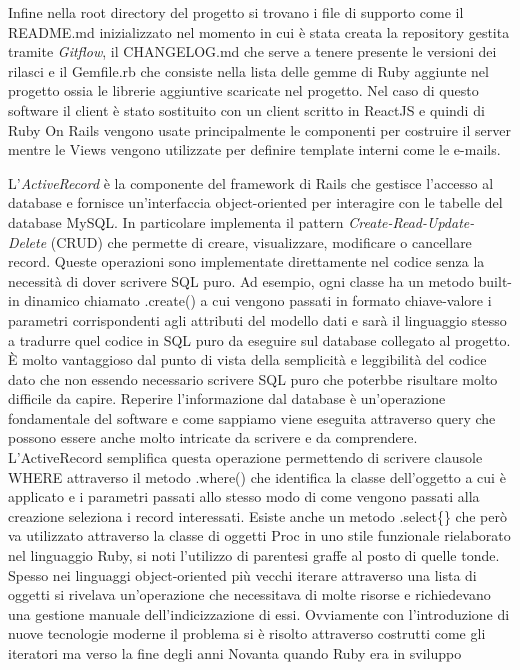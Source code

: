 \documentclass[target=bach,aauheader=,style=]{thud}
\begin{document}
Infine nella root directory del progetto si trovano i file di supporto come il README.md inizializzato nel momento in cui è stata creata la repository gestita tramite
\textit{Gitflow}\cite{gitflow}, il CHANGELOG.md che serve a tenere presente le versioni dei rilasci 
e il Gemfile.rb che consiste nella lista delle gemme di Ruby aggiunte nel progetto ossia le librerie aggiuntive scaricate nel progetto.
Nel caso di questo software il client è stato sostituito con un client scritto in ReactJS e quindi di Ruby On Rails vengono usate principalmente le componenti
per costruire il server mentre le Views vengono utilizzate per definire template interni come le e-mails.
\par L'\textit{ActiveRecord} è la componente del framework di Rails che gestisce l'accesso al database e fornisce un'interfaccia object-oriented per interagire con le tabelle
del database MySQL. In particolare implementa il pattern \textit{Create-Read-Update-Delete} (CRUD)\cite{ibm_crud} che permette di creare, visualizzare, modificare
o cancellare record. Queste operazioni sono implementate direttamente nel codice senza la necessità di dover scrivere SQL puro. Ad esempio, ogni classe ha un metodo built-in dinamico
chiamato .create() a cui vengono passati in formato chiave-valore i parametri corrispondenti agli attributi del modello dati e sarà il linguaggio stesso a tradurre
quel codice in SQL puro da eseguire sul database collegato al progetto. È molto vantaggioso dal punto di vista della semplicità e leggibilità del codice dato che
non essendo necessario scrivere SQL puro che poterbbe risultare molto difficile da capire.
Reperire l'informazione dal database è un'operazione fondamentale del software e come sappiamo viene eseguita attraverso query che possono essere anche molto intricate
da scrivere e da comprendere. L'ActiveRecord semplifica questa operazione permettendo di scrivere clausole WHERE attraverso il metodo .where() che identifica la classe dell'oggetto
a cui è applicato e i parametri passati allo stesso modo di come vengono passati alla creazione seleziona i record interessati. Esiste anche un metodo .select\{\} che però va utilizzato
attraverso la classe di oggetti Proc in uno stile funzionale rielaborato nel linguaggio Ruby, si noti l'utilizzo di parentesi graffe al posto di quelle tonde. Spesso nei linguaggi
object-oriented più vecchi iterare attraverso una lista di oggetti si rivelava un'operazione che necessitava di molte risorse e richiedevano una gestione manuale dell'indicizzazione di essi.
Ovviamente con l'introduzione di nuove tecnologie moderne il problema si è risolto attraverso costrutti come gli iteratori ma verso la fine degli anni Novanta quando Ruby era in sviluppo
\end{document}
